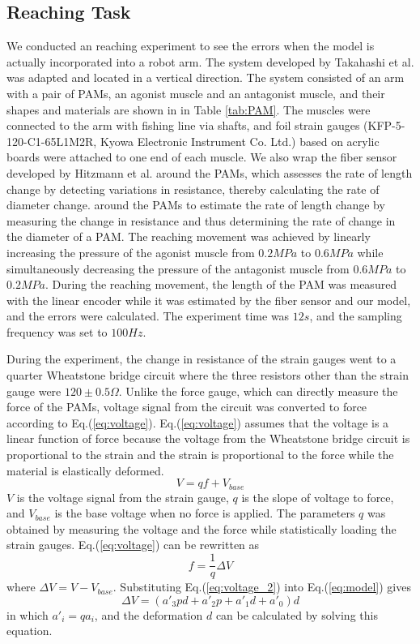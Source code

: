 \subsection{Reaching Task}
We conducted an reaching experiment to see the errors when the model is actually incorporated into a robot arm. The system developed by Takahashi et al.\cite{takahashi} was adapted and located in a vertical direction. The system consisted of an arm with a pair of PAMs, an agonist muscle and an antagonist muscle, and their shapes and materials are shown in in Table \ref{tab:PAM}. The muscles were connected to the arm with fishing line via shafts, and foil strain gauges (KFP-5-120-C1-65L1M2R, Kyowa Electronic Instrument Co. Ltd.) based on acrylic boards were attached to one end of each muscle.
We also wrap the fiber sensor developed by Hitzmann et al. \cite{fiber} around the PAMs, which assesses the rate of length change by detecting variations in resistance, thereby calculating the rate of diameter change. around the PAMs to estimate the rate of length change by measuring the change in resistance and thus determining the rate of change in the diameter of a PAM.
The reaching movement was achieved by linearly increasing the pressure of the agonist muscle from $0.2 \si{MPa}$ to $0.6 \si{MPa}$ while simultaneously decreasing the pressure of the antagonist muscle from $0.6 \si{MPa}$ to $0.2 \si{MPa}$. During the reaching movement, the length of the PAM was measured with the linear encoder while it was estimated by the fiber sensor and our model, and the errors were calculated. The experiment time was $12 \si{s}$, and the sampling frequency was set to $100 \si{Hz}$.

During the experiment, the change in resistance of the strain gauges went to a quarter Wheatstone bridge circuit where the three resistors other than the strain gauge were $120 \pm 0.5 \Omega$. Unlike the force gauge, which can directly measure the force of the PAMs, voltage signal from the circuit was converted to force according to Eq.(\ref{eq:voltage}). Eq.(\ref{eq:voltage}) assumes that the voltage is a linear function of force because the voltage from the Wheatstone bridge circuit is proportional to the strain\cite{wheatstone} and the strain is proportional to the force while the material is elastically deformed.
\begin{equation}
    \label{eq:voltage}
    V=qf+V_{base}
\end{equation}
$V$ is the voltage signal from the strain gauge, $q$ is the slope of voltage to force, and $V_{base}$ is the base voltage when no force is applied.
The parameters $q$ was obtained by measuring the voltage and the force while statistically loading the strain gauges.
Eq.(\ref{eq:voltage}) can be rewritten as 
\begin{equation}
    \label{eq:voltage_2}
    f = \frac{1}{q}\Delta V
\end{equation}
where $\Delta V = V - V_{base}$. Substituting Eq.(\ref{eq:voltage_2}) into Eq.(\ref{eq:model}) gives
\begin{equation}
    \label{eq:model_voltage}
    \Delta V = (a'_3pd + a'_2p + a'_1d + a'_0)d
\end{equation}
in which $a'_i=qa_i$, and the deformation $d$ can be calculated by solving this equation.

